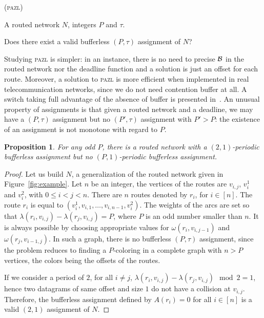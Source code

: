\documentclass[a4paper,10pt]{journal}
\newtheorem{proposition}{Proposition}
\newcommand\pazl{\textsc{pazl}\xspace}
\begin{document}
     \bigskip

      (\pazl)

        A routed network $N$, integers $P$ and $\tau$.
      
       Does there exist a valid bufferless $(P,\tau)$ assignment of $N$?
      \bigskip


     Studying \pazl is simpler: in an instance, there is no need to precise $\cal{B}$ in the routed network nor the deadline function and a solution is just an offset for each route.  Moreover, a solution to \pazl is more efficient when implemented in real telecommunication networks, since we do not need contention buffer at all. A switch taking full advantage of the absence of buffer is presented in~\cite{Marc2201:Experimental}. 
      An unusual property of assignments is that given a routed network and a deadline, we may have a $(P,\tau)$ assignment but no $(P',\tau)$ assignment with $P' > P$: the existence of an assignment is not monotone with regard to $P$.

	\begin{proposition} \label{prop:monotonic}
	 For any odd $P$, there is a routed network with a $(2,1)$-periodic bufferless assignment but no $(P,1)$-periodic bufferless assignment.
	\end{proposition}

	\begin{proof}
      Let us build $N$, a generalization of the routed network given in Figure~\ref{fig:example}. 
      Let $n$ be an integer, the vertices of the routes are $v_{i,j}$, $v_i^1$ and $v_i^2$, with $0 \leq i < j <n$. 
      There are $n$ routes denoted by $r_i$, for $i \in [n]$. The route $r_i$ is equal to $(v_i^1,v_{i,1},\dots,v_{i,n-1},v_i^2)$. The weights of the arcs are set so that $\lambda(r_i, v_{i,j}) - \lambda(r_j,v_{i,j})= P$, where $P$ is an odd number smaller than $n$. It is always possible by choosing appropriate values for $\omega(r_i,v_{i,j-1})$ and $\omega(r_j,v_{i-1,j})$. In such a graph, there is no bufferless $(P,\tau)$ assignment, since the problem reduces to finding a $P$-coloring in a complete graph with $n > P$ vertices, the colors being the offsets of the routes.


      If we consider a period of $2$, for all $i \neq j$, $\lambda(r_i, v_{i,j}) - \lambda(r_j, v_{i,j}) \mod 2 = 1$, hence two datagrams of same offset and size $1$ do not have a collision at $v_{i,j}$. Therefore, the bufferless assignment defined by $A(r_i) = 0$ for all $i \in [n]$ is a valid $(2,1)$ assignment of $N$.      
\end{proof}
\end{document}
